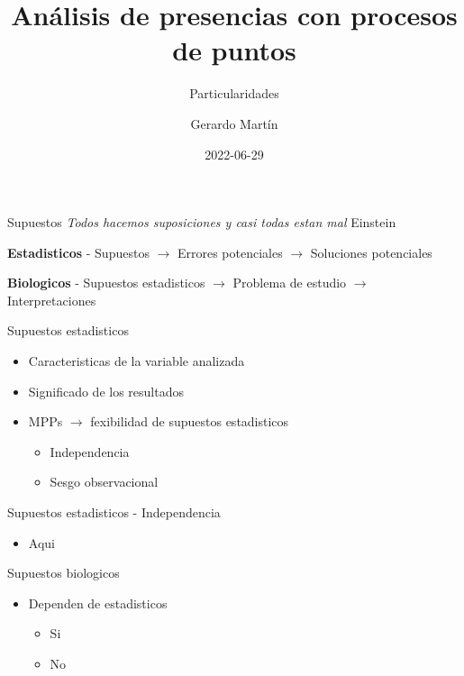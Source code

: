 \documentclass[
  11pt,
  ignorenonframetext,
]{beamer}
\title{Análisis de presencias con procesos de puntos}
\subtitle{Particularidades}
\author{Gerardo Martín}
\date{2022-06-29}
\providecommand{\tightlist}{%
  \setlength{\itemsep}{0pt}\setlength{\parskip}{0pt}}
\begin{document}
\frame{\titlepage}

\begin{frame}{Supuestos}
\protect\hypertarget{supuestos}{}
\emph{Todos hacemos suposiciones y casi todas estan mal} Einstein

\textbf{Estadisticos} - Supuestos \(\rightarrow\) Errores potenciales
\(\rightarrow\) Soluciones potenciales

\textbf{Biologicos} - Supuestos estadisticos \(\rightarrow\) Problema de
estudio \(\rightarrow\) Interpretaciones
\end{frame}

\begin{frame}{Supuestos estadisticos}
\protect\hypertarget{supuestos-estadisticos}{}
\begin{itemize}
\item
  Caracteristicas de la variable analizada
\item
  Significado de los resultados
\item
  MPPs \(\rightarrow\) fexibilidad de supuestos estadisticos

  \begin{itemize}
  \tightlist
  \item
    Independencia
  \item
    Sesgo observacional
  \end{itemize}
\end{itemize}
\end{frame}

\begin{frame}{Supuestos estadisticos - Independencia}
\protect\hypertarget{supuestos-estadisticos---independencia}{}
\begin{itemize}
\tightlist
\item
  Aqui
\end{itemize}
\end{frame}

\begin{frame}{Supuestos biologicos}
\protect\hypertarget{supuestos-biologicos}{}
\begin{itemize}
\item
  Dependen de estadisticos

  \begin{itemize}
  \tightlist
  \item
    Si
  \item
    No
  \end{itemize}
\end{itemize}
\end{frame}
\end{document}
